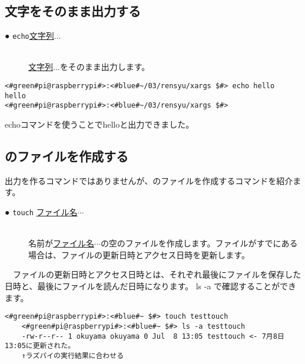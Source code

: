 \subsection{文字をそのまま出力する}
\begin{description}
    \item[● \texttt{echo}\textvisiblespace \underline{文字列}$\ldots$]\mbox{}\\
    \underline{文字列}$\ldots$をそのまま出力します。
    \label{cmd:echo}
\end{description}

\begin{lstlisting}[caption=echoコマンド]
<#green#pi@raspberrypi#>:<#blue#~/03/rensyu/xargs $#> echo hello
hello
<#green#pi@raspberrypi#>:<#blue#~/03/rensyu/xargs $#>
\end{lstlisting}
echoコマンドを使うことでhelloと出力できました。


\subsection{のファイルを作成する}
出力を作るコマンドではありませんが、のファイルを作成するコマンドを紹介ます。

\begin{description}
    \item[● \texttt{touch} \underline{ファイル名}$\cdots$]\mbox{}\\
    名前が\underline{ファイル名}$\cdots$の空のファイルを作成します。ファイルがすでにある場合は、ファイルの更新日時とアクセス日時を更新します。 
\end{description}
　ファイルの更新日時とアクセス日時とは、それぞれ最後にファイルを保存した日時と、最後にファイルを読んだ日時になります。 ls -a で確認することができます。

\begin{lstlisting}[caption=空のファイルを作成, label=cmd:touch]
    <#green#pi@raspberrypi#>:<#blue#~ $#> touch testtouch
    <#green#pi@raspberrypi#>:<#blue#~ $#> ls -a testtouch
    -rw-r--r-- 1 okuyama okuyama 0 Jul  8 13:05 testtouch <- 7月8日13:05に更新された。
    ↑ラズパイの実行結果に合わせる
\end{lstlisting}

\begin{tcolorbox}[title=\useOmetoi]
    \begin{enumerate}
    \end{enumerate}
\end{tcolorbox}

